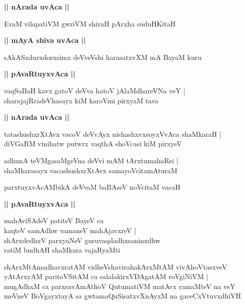 \documentclass[twoside,12pt,openright]{book}
\newcounter{shloka}[chapter]
\def\uvaca#1{\centerline{{\large\textbf{#1}}}}
\begin{document}
\uvaca{|| nArada uvAca ||}

\begin{shloka}%
EvaM vilapatiVM gwriVM shivaH pArxha suduHKitaH 
\end{shloka}

\uvaca{|| mAyA shiva uvAca ||}

\begin{shloka}%
sAkASxdurxdorxsimx deVveVshi harasatxvXM mA BayaM kuru 
\end{shloka}

\uvaca{|| pAvaRtuyxvAca ||}

\begin{shloka}%
vaqSaBaH kavx gatoV deVva hatoV jAlaMdhareVNa veY |\\
sharajajRradeVhasayx kiM karoVmi pirxyaM tava 
\end{shloka}

\uvaca{|| nArada uvAca ||}

\begin{shloka}%
tatashushxrXtAvx vacoV deVvAyx nishashxvxsoyxVvAca shaMkaraH |\\
diVGaRM vinihatw putwrx vaqthA shoVcasi kiM pirxyeV 
\end{shloka}

\begin{shloka}%
adhunA teVMgasaMgeVna deVvi mAM tArxtumahaRsi |\\
shaMkarasayx vacashushxrXtAvx samayoVcitamAturaM 
\end{shloka}

\begin{shloka}%
parxtuyxvAcAMbikA deVvaM baBAseV noVcitaM vacaH 
\end{shloka}

\uvaca{|| pAvaRtuyxvAca ||}

\begin{shloka}%
mahAviSAdeV patiteV BayeV ca \\
kaqteV samAdhw vamaneV mahAjavxreV |\\
shArxdedhxV parxyaNeV guruvaqdadhxsaninxdhw\\
ratiM budhAH shaMkara vajaRyaMti
\end{shloka}

\begin{shloka}%
shArxMtAmadhavxratAM vidheVshavirahakArxMtAM vivAhoVtasxveV \\
yAtArxyAM paritoVSitAM ca salalakirxVDAgatAM roVgiNiVM |\\
mugAdhxM ca parxsavAmAthoV QutumatiVM matAvx ramaMteV na veY \\
meVneV BoVgayxtayA sa gwtamaQuSisatxvXnAyxM na gaceCxVtuvxdhiVH 
\end{shloka}
\end{document}
